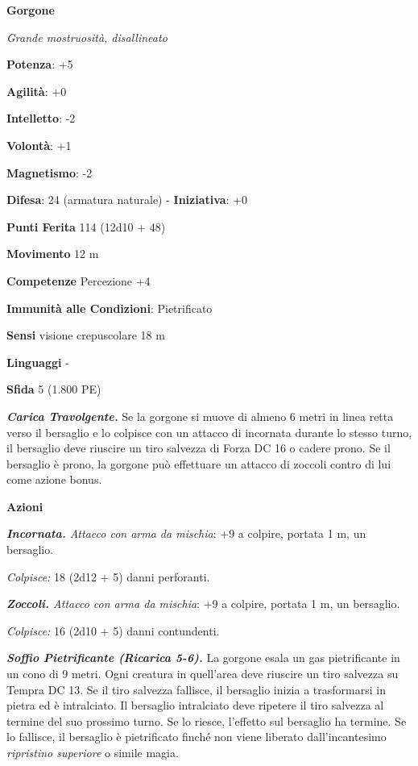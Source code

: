 \begin{multicols}{2}
\textbf{Gorgone}

\emph{Grande mostruosità, disallineato}

\textbf{Potenza}: +5

\textbf{Agilità}: +0

\textbf{Intelletto}: -2

\textbf{Volontà}: +1

\textbf{Magnetismo}: -2

\textbf{Difesa}: 24 (armatura naturale) - \textbf{Iniziativa}: +0

\textbf{Punti Ferita} 114 (12d10 + 48)

\textbf{Movimento} 12 m

\textbf{Competenze} Percezione +4

\textbf{Immunità alle Condizioni}: Pietrificato

\textbf{Sensi} visione crepuscolare 18 m

\textbf{Linguaggi} -

\textbf{Sfida} 5 (1.800 PE)\smallskip

\emph{\textbf{Carica Travolgente.}} Se la gorgone si muove di almeno 6
metri in linea retta verso il bersaglio e lo colpisce con un attacco di
incornata durante lo stesso turno, il bersaglio deve riuscire un tiro
salvezza di Forza DC 16 o cadere prono. Se il bersaglio è prono, la
gorgone può effettuare un attacco di zoccoli contro di lui come azione
bonus.

\smallskip\textbf{Azioni}

\emph{\textbf{Incornata.} Attacco con arma da mischia}: +9 a colpire,
portata 1 m, un bersaglio.

\emph{Colpisce:} 18 (2d12 + 5) danni perforanti.

\emph{\textbf{Zoccoli.} Attacco con arma da mischia}: +9 a colpire,
portata 1 m, un bersaglio.

\emph{Colpisce:} 16 (2d10 + 5) danni contundenti.

\emph{\textbf{Soffio Pietrificante (Ricarica 5-6).}} La gorgone esala un
gas pietrificante in un cono di 9 metri. Ogni creatura in quell'area
deve riuscire un tiro salvezza su Tempra DC 13. Se il tiro
salvezza fallisce, il bersaglio inizia a trasformarsi in pietra ed è
intralciato. Il bersaglio intralciato deve ripetere il tiro salvezza al
termine del suo prossimo turno. Se lo riesce, l'effetto sul bersaglio ha
termine. Se lo fallisce, il bersaglio è pietrificato finché non viene
liberato dall'incantesimo \emph{ripristino superiore} o simile magia.


\end{multicols}
